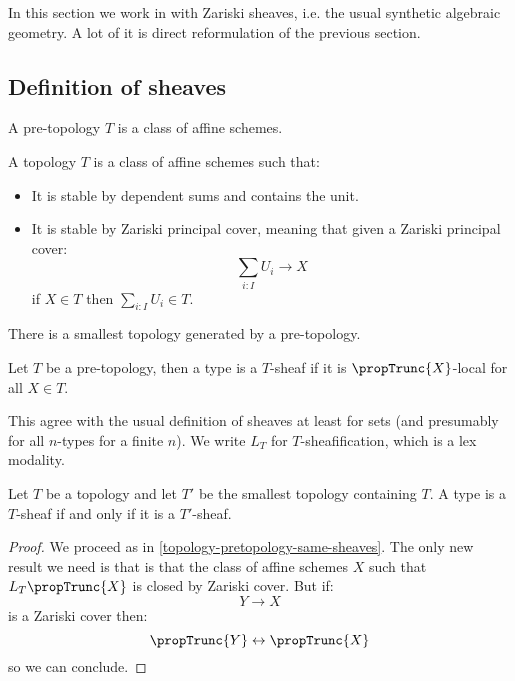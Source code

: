 In this section we work in with Zariski sheaves, i.e. the usual synthetic algebraic geometry. A lot of it is direct reformulation of the previous section.

\subsection{Definition of sheaves}

\begin{definition}
A pre-topology $T$ is a class of affine schemes.
\end{definition}

\begin{definition}
A topology $T$ is a class of affine schemes such that:
\begin{itemize}
\item It is stable by dependent sums and contains the unit.
\item It is stable by Zariski principal cover, meaning that given a Zariski principal cover:
\[\sum_{i:I}U_i \to X\]
if $X\in T$ then $\sum_{i:I}U_i\in T$.
\end{itemize}
\end{definition}

There is a smallest topology generated by a pre-topology. 

\begin{definition}
Let $T$ be a pre-topology, then a type is a $T$-sheaf if it is $\propTrunc{X}$-local for all $X\in T$. 
\end{definition}

This agree with the usual definition of sheaves at least for sets (and presumably for all $n$-types for a finite $n$). We write $L_T$ for $T$-sheafification, which is a lex modality. 

\begin{lemma}\label{sheaf-generated-topology}
Let $T$ be a topology and let $T'$ be the smallest topology containing $T$. A type is a $T$-sheaf if and only if it is a $T'$-sheaf.
\end{lemma}

\begin{proof}
We proceed as in \cref{topology-pretopology-same-sheaves}. The only new result we need is that is that the class of affine schemes $X$ such that $L_T\propTrunc{X}$ is closed by Zariski cover. But if:
\[Y\to X\]
is a Zariski cover then:
\[\propTrunc{Y}\leftrightarrow\propTrunc{X}\]
so we can conclude.
\end{proof}


